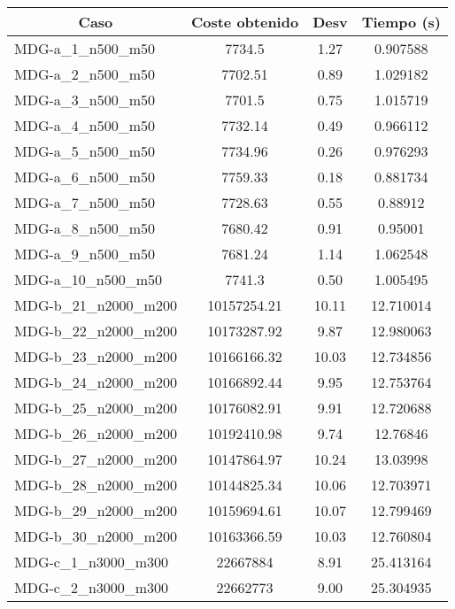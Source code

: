 \documentclass[11pt,a4paper]{article}
\begin{document}
\begin{table}[H]
	\begin{center}
		\begin{tabular}{|l|c|c|c|} 
			\hline
			\multicolumn{1}{|c|}{\textbf{Caso}} & \textbf{Coste obtenido} & \textbf{Desv} & \textbf{Tiempo (s)} \\ \hline
					MDG-a\_1\_n500\_m50 & 7734.5 & 1.27 & 0.907588 \\ \hline
					MDG-a\_2\_n500\_m50 & 7702.51 & 0.89 & 1.029182 \\ \hline
					MDG-a\_3\_n500\_m50 & 7701.5 & 0.75 & 1.015719 \\ \hline
					MDG-a\_4\_n500\_m50 & 7732.14 & 0.49 & 0.966112 \\ \hline
					MDG-a\_5\_n500\_m50 & 7734.96 & 0.26 & 0.976293 \\ \hline
					MDG-a\_6\_n500\_m50 & 7759.33 & 0.18 & 0.881734 \\ \hline
					MDG-a\_7\_n500\_m50 & 7728.63 & 0.55 & 0.88912 \\ \hline
					MDG-a\_8\_n500\_m50 & 7680.42 & 0.91 & 0.95001 \\ \hline
					MDG-a\_9\_n500\_m50 & 7681.24 & 1.14 & 1.062548 \\ \hline
					MDG-a\_10\_n500\_m50 & 7741.3 & 0.50 & 1.005495 \\ \hline
					MDG-b\_21\_n2000\_m200 & 10157254.21 & 10.11 & 12.710014 \\ \hline
					MDG-b\_22\_n2000\_m200 & 10173287.92 & 9.87 & 12.980063 \\ \hline
					MDG-b\_23\_n2000\_m200 & 10166166.32 & 10.03 & 12.734856 \\ \hline
					MDG-b\_24\_n2000\_m200 & 10166892.44 & 9.95 & 12.753764 \\ \hline
					MDG-b\_25\_n2000\_m200 & 10176082.91 & 9.91 & 12.720688 \\ \hline
					MDG-b\_26\_n2000\_m200 & 10192410.98 & 9.74 & 12.76846 \\ \hline
					MDG-b\_27\_n2000\_m200 & 10147864.97 & 10.24 & 13.03998 \\ \hline
					MDG-b\_28\_n2000\_m200 & 10144825.34 & 10.06 & 12.703971 \\ \hline
					MDG-b\_29\_n2000\_m200 & 10159694.61 & 10.07 & 12.799469 \\ \hline
					MDG-b\_30\_n2000\_m200 & 10163366.59 & 10.03 & 12.760804 \\ \hline
					MDG-c\_1\_n3000\_m300 & 22667884 & 8.91 & 25.413164 \\ \hline
					MDG-c\_2\_n3000\_m300 & 22662773 & 9.00 & 25.304935 \\ \hline

\end{tabular}
\end{center}
\end{table}
\end{document}
